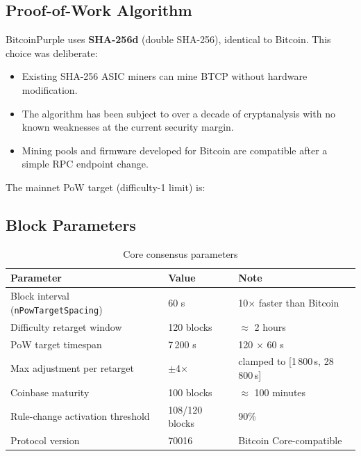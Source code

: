 \documentclass[12pt, a4paper]{article}
\begin{document}
\subsection{Proof-of-Work Algorithm}

BitcoinPurple uses \textbf{SHA-256d} (double SHA-256), identical to Bitcoin.
This choice was deliberate:

\begin{itemize}[noitemsep]
  \item Existing SHA-256 ASIC miners can mine BTCP without hardware
        modification.
  \item The algorithm has been subject to over a decade of cryptanalysis
        with no known weaknesses at the current security margin.
  \item Mining pools and firmware developed for Bitcoin are compatible after
        a simple RPC endpoint change.
\end{itemize}

The mainnet PoW target (difficulty-1 limit) is:

\begin{center}
{\small\ttfamily{}}
\end{center}

\subsection{Block Parameters}

\begin{table}[h!]
\centering
\caption{Core consensus parameters}
\small
\begin{tabular}{@{}lll@{}}
\toprule
\textbf{Parameter} & \textbf{Value} & \textbf{Note} \\
\midrule
Block interval (\texttt{nPowTargetSpacing}) & 60 s & 10$\times$ faster than Bitcoin \\
Difficulty retarget window  & 120 blocks     & $\approx$ 2 hours \\
PoW target timespan         & 7\,200 s       & 120 $\times$ 60 s \\
Max adjustment per retarget & $\pm$4$\times$ & clamped to [1\,800\,s, 28\,800\,s] \\
Coinbase maturity           & 100 blocks     & $\approx$ 100 minutes \\
Rule-change activation threshold & 108/120 blocks & 90\% \\
Protocol version            & 70016          & Bitcoin Core-compatible \\
\bottomrule
\end{tabular}
\end{table}
\end{document}
